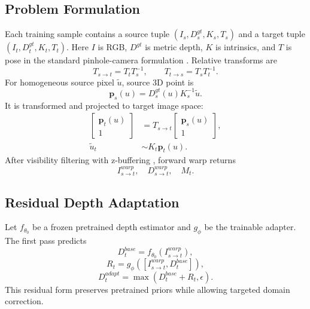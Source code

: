 \documentclass{article}
\begin{document}
\subsection{Problem Formulation}
Each training sample contains a source tuple $(I_s, D_s^{gt}, K_s, T_s)$ and a target tuple $(I_t, D_t^{gt}, K_t, T_t)$. Here $I$ is RGB, $D^{gt}$ is metric depth, $K$ is intrinsics, and $T$ is pose in the standard pinhole-camera formulation \cite{hartley2003multiple}. Relative transforms are
\begin{equation}
T_{s\rightarrow t}=T_tT_s^{-1}, \qquad T_{t\rightarrow s}=T_sT_t^{-1}.
\end{equation}
For homogeneous source pixel $\tilde{u}$, source 3D point is
\begin{equation}
\mathbf{p}_s(u)=D_s^{gt}(u)K_s^{-1}\tilde{u}.
\end{equation}
It is transformed and projected to target image space:
\begin{align}
\begin{bmatrix}
\mathbf{p}_t(u)\\
1
\end{bmatrix}
&=T_{s\rightarrow t}
\begin{bmatrix}
\mathbf{p}_s(u)\\
1
\end{bmatrix}, \\
\tilde{u}_t &\sim K_t\mathbf{p}_t(u).
\end{align}
After visibility filtering with z-buffering \cite{catmull1974subdivision}, forward warp returns
\begin{equation}
I_{s\rightarrow t}^{warp}, \quad D_{s\rightarrow t}^{warp}, \quad M_t.
\end{equation}

\subsection{Residual Depth Adaptation}
Let $f_{\theta_0}$ be a frozen pretrained depth estimator and $g_{\phi}$ be the trainable adapter. The first pass predicts
\begin{equation}
D_t^{base}=f_{\theta_0}(I_{s\rightarrow t}^{warp}),
\end{equation}
\begin{equation}
R_t=g_{\phi}\!\left([I_{s\rightarrow t}^{warp},D_t^{base}]\right),
\end{equation}
\begin{equation}
D_t^{adapt}=\max(D_t^{base}+R_t,\epsilon).
\end{equation}
This residual form preserves pretrained priors while allowing targeted domain correction.
\end{document}
